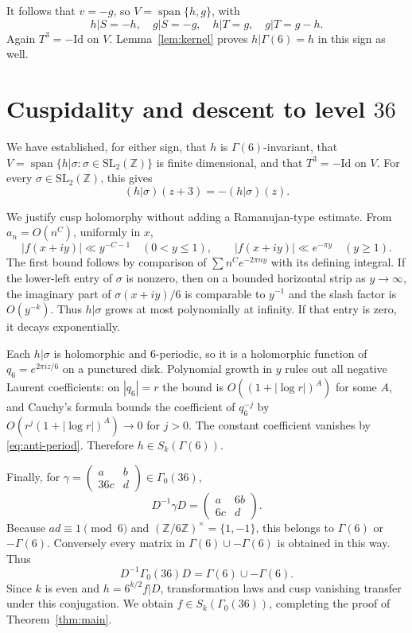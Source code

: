 \documentclass[11pt]{article}
\theoremstyle{remark}
\newcommand{\SL}{\mathrm{SL}}
\begin{document}
It follows that $v=-g$, so $V=\operatorname{span}\{h,g\}$, with
\[
 h|S=-h,\quad g|S=-g,\quad h|T=g,\quad g|T=g-h.
\]
Again $T^3=-\mathrm{Id}$ on $V$.  Lemma~\ref{lem:kernel} proves
$h|\Gamma(6)=h$ in this sign as well.

\section{Cuspidality and descent to level \texorpdfstring{$36$}{36}}

We have established, for either sign, that $h$ is $\Gamma(6)$-invariant,
that $V=\operatorname{span}\{h|\sigma:\sigma\in\SL_2(\mathbb Z)\}$ is
finite dimensional, and that $T^3=-\mathrm{Id}$ on $V$.
For every $\sigma\in\SL_2(\mathbb Z)$, this gives
\begin{equation}\label{eq:anti-period}
 (h|\sigma)(z+3)=-(h|\sigma)(z).
\end{equation}

We justify cusp holomorphy without adding a Ramanujan-type estimate.
From $a_n=O(n^C)$, uniformly in $x$,
\[
 |f(x+iy)|\ll y^{-C-1}\quad(0<y\le1),
 \qquad |f(x+iy)|\ll e^{-\pi y}\quad(y\ge1).
\]
The first bound follows by comparison of
$\sum n^C e^{-2\pi ny}$ with its defining integral.  If the lower-left
entry of $\sigma$ is nonzero, then on a bounded horizontal strip as
$y\to\infty$, the imaginary part of $\sigma(x+iy)/6$ is comparable to
$y^{-1}$ and the slash factor is $O(y^{-k})$.  Thus $h|\sigma$ grows
at most polynomially at infinity.  If that entry is zero, it decays
exponentially.

Each $h|\sigma$ is holomorphic and $6$-periodic, so it is a holomorphic
function of $q_6=e^{2\pi iz/6}$ on a punctured disk.  Polynomial growth
in $y$ rules out all negative Laurent coefficients: on $|q_6|=r$ the
bound is $O((1+|\log r|)^A)$ for some $A$, and Cauchy's formula bounds
the coefficient of $q_6^{-j}$ by
$O(r^j(1+|\log r|)^A)\to0$ for $j>0$.
The constant coefficient vanishes by \eqref{eq:anti-period}.
Therefore $h\in S_k(\Gamma(6))$.

Finally, for $\gamma=\begin{pmatrix}a&b\\36c&d\end{pmatrix}\in\Gamma_0(36)$,
\[
 D^{-1}\gamma D=\begin{pmatrix}a&6b\\6c&d\end{pmatrix}.
\]
Because $ad\equiv1\pmod6$ and $(\mathbb Z/6\mathbb Z)^\times=\{1,-1\}$,
this belongs to $\Gamma(6)$ or $-\Gamma(6)$.  Conversely every matrix
in $\Gamma(6)\cup-\Gamma(6)$ is obtained in this way.  Thus
\[
 D^{-1}\Gamma_0(36)D=\Gamma(6)\cup-\Gamma(6).
\]
Since $k$ is even and $h=6^{k/2}f|D$, transformation laws and cusp
vanishing transfer under this conjugation.  We obtain
$f\in S_k(\Gamma_0(36))$, completing the proof of
Theorem~\ref{thm:main}.
\end{document}
